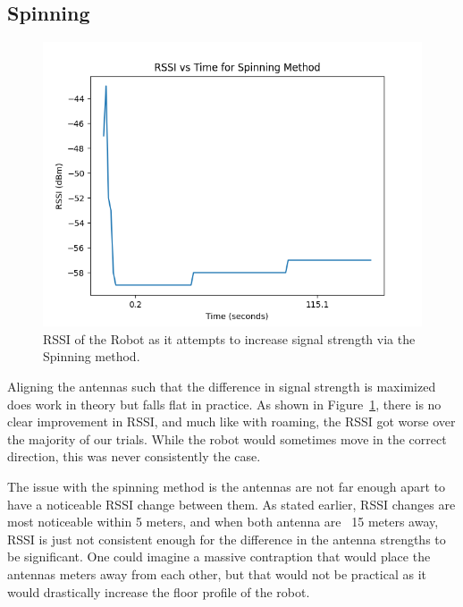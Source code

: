 \subsection{Spinning}
\begin{figure}[tp]
\centering
\includegraphics[scale=0.5]{figures/rssi_microwave}
\caption{RSSI of the Robot as it attempts to increase signal strength via the Spinning method.}
\label{fig:rssi_microwave}
\end{figure}
Aligning the antennas such that the difference in signal strength is maximized does work in theory but falls flat in practice. As shown in Figure~\ref{fig:rssi_microwave}, there is no clear improvement in RSSI, and much like with roaming, the RSSI got worse over the majority of our trials. While the robot would sometimes move in the correct direction, this was never consistently the case. 

The issue with the spinning method is the antennas are not far enough apart to have a noticeable RSSI change between them. As stated earlier, RSSI changes are most noticeable within 5 meters, and when both antenna are ~15 meters away, RSSI is just not consistent enough for the difference in the antenna strengths to be significant. One could imagine a massive contraption that would place the antennas meters away from each other, but that would not be practical as it would drastically increase the floor profile of the robot. 
